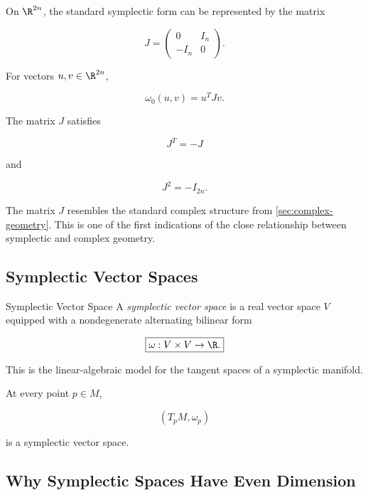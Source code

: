 On \(\R^{2n}\), the standard symplectic form can be represented by the
matrix

\[
\boxed{
J=
\begin{pmatrix}
0&I_n\\
-I_n&0
\end{pmatrix}.
}
\]

For vectors \(u,v\in\R^{2n}\),

\[
\boxed{
\omega_0(u,v)=u^T Jv.
}
\]

The matrix \(J\) satisfies

\[
\boxed{
J^T=-J
}
\]

and

\[
\boxed{
J^2=-I_{2n}.
}
\]

\begin{notebox}
The matrix \(J\) resembles the standard complex structure from
\cref{sec:complex-geometry}. This is one of the first indications of the
close relationship between symplectic and complex geometry.
\end{notebox}

\subsection{Symplectic Vector Spaces}
\label{subsec:symplectic-vector-spaces}

\begin{definitionbox}{Symplectic Vector Space}
A \emph{symplectic vector space} is a real vector space \(V\) equipped with
a nondegenerate alternating bilinear form

\[
\boxed{
\omega:V\times V\to\R.
}
\]
\end{definitionbox}

This is the linear-algebraic model for the tangent spaces of a symplectic
manifold.

At every point \(p\in M\),

\[
\boxed{
(T_pM,\omega_p)
}
\]

is a symplectic vector space.

\subsection{Why Symplectic Spaces Have Even Dimension}
\label{subsec:symplectic-even-dimension}

